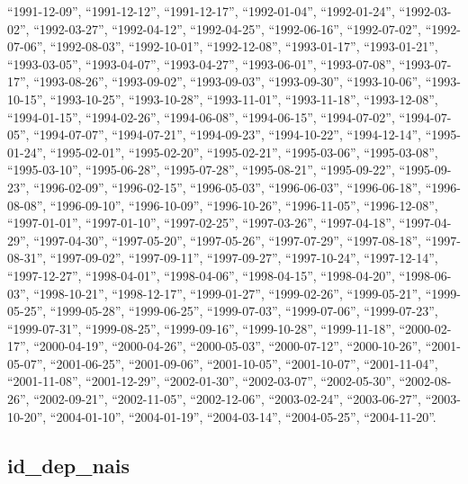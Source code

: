 \documentclass[
  letterpaper,
  DIV=11,
  numbers=noendperiod]{scrartcl}
\begin{document}
\begin{itemize}
  ``1991-12-09'', ``1991-12-12'', ``1991-12-17'', ``1992-01-04'',
  ``1992-01-24'', ``1992-03-02'', ``1992-03-27'', ``1992-04-12'',
  ``1992-04-25'', ``1992-06-16'', ``1992-07-02'', ``1992-07-06'',
  ``1992-08-03'', ``1992-10-01'', ``1992-12-08'', ``1993-01-17'',
  ``1993-01-21'', ``1993-03-05'', ``1993-04-07'', ``1993-04-27'',
  ``1993-06-01'', ``1993-07-08'', ``1993-07-17'', ``1993-08-26'',
  ``1993-09-02'', ``1993-09-03'', ``1993-09-30'', ``1993-10-06'',
  ``1993-10-15'', ``1993-10-25'', ``1993-10-28'', ``1993-11-01'',
  ``1993-11-18'', ``1993-12-08'', ``1994-01-15'', ``1994-02-26'',
  ``1994-06-08'', ``1994-06-15'', ``1994-07-02'', ``1994-07-05'',
  ``1994-07-07'', ``1994-07-21'', ``1994-09-23'', ``1994-10-22'',
  ``1994-12-14'', ``1995-01-24'', ``1995-02-01'', ``1995-02-20'',
  ``1995-02-21'', ``1995-03-06'', ``1995-03-08'', ``1995-03-10'',
  ``1995-06-28'', ``1995-07-28'', ``1995-08-21'', ``1995-09-22'',
  ``1995-09-23'', ``1996-02-09'', ``1996-02-15'', ``1996-05-03'',
  ``1996-06-03'', ``1996-06-18'', ``1996-08-08'', ``1996-09-10'',
  ``1996-10-09'', ``1996-10-26'', ``1996-11-05'', ``1996-12-08'',
  ``1997-01-01'', ``1997-01-10'', ``1997-02-25'', ``1997-03-26'',
  ``1997-04-18'', ``1997-04-29'', ``1997-04-30'', ``1997-05-20'',
  ``1997-05-26'', ``1997-07-29'', ``1997-08-18'', ``1997-08-31'',
  ``1997-09-02'', ``1997-09-11'', ``1997-09-27'', ``1997-10-24'',
  ``1997-12-14'', ``1997-12-27'', ``1998-04-01'', ``1998-04-06'',
  ``1998-04-15'', ``1998-04-20'', ``1998-06-03'', ``1998-10-21'',
  ``1998-12-17'', ``1999-01-27'', ``1999-02-26'', ``1999-05-21'',
  ``1999-05-25'', ``1999-05-28'', ``1999-06-25'', ``1999-07-03'',
  ``1999-07-06'', ``1999-07-23'', ``1999-07-31'', ``1999-08-25'',
  ``1999-09-16'', ``1999-10-28'', ``1999-11-18'', ``2000-02-17'',
  ``2000-04-19'', ``2000-04-26'', ``2000-05-03'', ``2000-07-12'',
  ``2000-10-26'', ``2001-05-07'', ``2001-06-25'', ``2001-09-06'',
  ``2001-10-05'', ``2001-10-07'', ``2001-11-04'', ``2001-11-08'',
  ``2001-12-29'', ``2002-01-30'', ``2002-03-07'', ``2002-05-30'',
  ``2002-08-26'', ``2002-09-21'', ``2002-11-05'', ``2002-12-06'',
  ``2003-02-24'', ``2003-06-27'', ``2003-10-20'', ``2004-01-10'',
  ``2004-01-19'', ``2004-03-14'', ``2004-05-25'', ``2004-11-20''.
\end{itemize}

\fullline

\subsection{id\_dep\_nais}\label{id_dep_nais}
\end{document}
